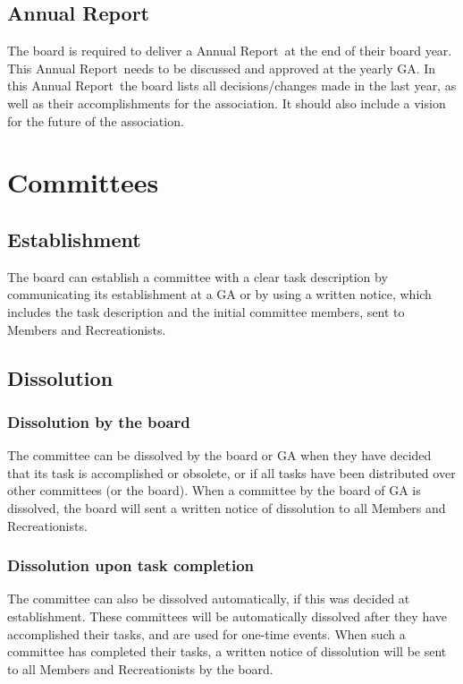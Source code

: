 \documentclass[a4paper]{article}
\newcommand{\Ajv}{Annual Report} %
\begin{document}
\subsection{\Ajv}
The board is required to deliver a \Ajv\ at the end of their board year. This \Ajv\ needs to be discussed and approved at the yearly GA. In this \Ajv\ the board lists all decisions/changes made in the last year, as well as their accomplishments for the association. It should also include a vision for the future of the association.

\pagebreak

\section{Committees}
\subsection{Establishment}
The board can establish a committee with a clear task description by communicating its establishment at a GA or by using a written notice, which includes the task description and the initial committee members, sent to Members and Recreationists.

\subsection{Dissolution}
\subsubsection{Dissolution by the board}
The committee can be dissolved by the board or GA when they have decided that its task is accomplished or obsolete, or if all tasks have been distributed over other committees (or the board). When a committee by the board of GA is dissolved, the board will sent a written notice of dissolution to all Members and Recreationists.

\subsubsection{Dissolution upon task completion}
The committee can also be dissolved automatically, if this was decided at establishment. These committees will be automatically dissolved after they have accomplished their tasks, and are used for one-time events. When such a committee has completed their tasks, a written notice of dissolution will be sent to all Members and Recreationists by the board.
\end{document}
